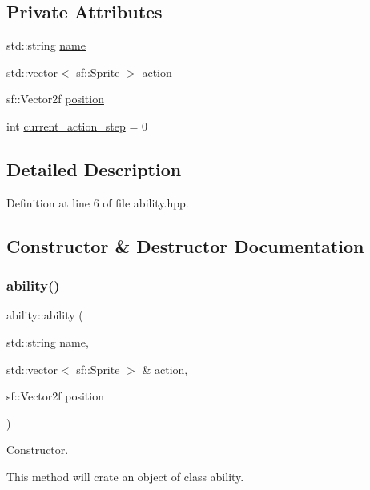 \subsection*{Private Attributes}
\begin{DoxyCompactItemize}
\item 
std\+::string \hyperlink{classability_a0064d2793f684924720a08b059ec2ee0}{name}
\item 
std\+::vector$<$ sf\+::\+Sprite $>$ \hyperlink{classability_aaccb2020f374c640eddfce7f1a669821}{action}
\item 
sf\+::\+Vector2f \hyperlink{classability_a36d5b1ac8a8a2df0f1790f3ddf320fad}{position}
\item 
int \hyperlink{classability_a5dbf426e4716c3cc09a8ec0dafb148a0}{current\+\_\+action\+\_\+step} = 0
\end{DoxyCompactItemize}


\subsection{Detailed Description}


Definition at line 6 of file ability.\+hpp.



\subsection{Constructor \& Destructor Documentation}
\mbox{\label{classability_a467a2d8bf397119e9856d1cf8d2c58bc}} 
\subsubsection{\texorpdfstring{ability()}{ability()}}
{\footnotesize\ttfamily ability\+::ability (\begin{DoxyParamCaption}\item[{std\+::string}]{name,  }\item[{std\+::vector$<$ sf\+::\+Sprite $>$ \&}]{action,  }\item[{sf\+::\+Vector2f}]{position }\end{DoxyParamCaption})}



Constructor. 

This method will crate an object of class ability.~\newline


